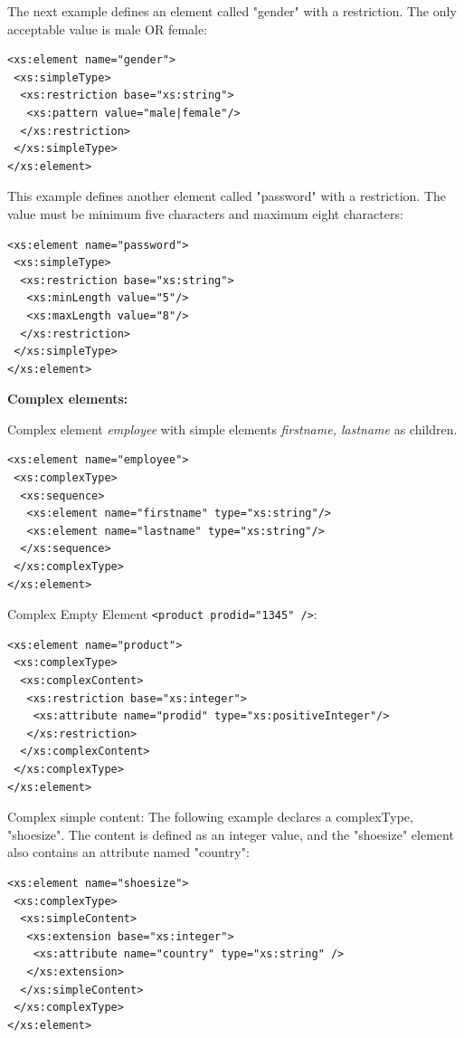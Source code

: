 \documentclass[11pt,oneside,a4paper]{article}
\begin{document}
\newpage

The next example defines an element called "gender" with a restriction. The only acceptable value is male OR female:
\lstset{language=XML}
\begin{lstlisting}
<xs:element name="gender">
 <xs:simpleType>
  <xs:restriction base="xs:string">
   <xs:pattern value="male|female"/>
  </xs:restriction>
 </xs:simpleType>
</xs:element> 
\end{lstlisting}

This example defines another element called "password" with a restriction. The value must be minimum five characters and maximum eight characters:
\lstset{language=XML}
\begin{lstlisting}
<xs:element name="password">
 <xs:simpleType>
  <xs:restriction base="xs:string">
   <xs:minLength value="5"/>
   <xs:maxLength value="8"/>
  </xs:restriction>
 </xs:simpleType>
</xs:element> 
\end{lstlisting}

\textbf{Complex elements:}

Complex element \textit{employee} with simple elements \textit{firstname, lastname} as children.
\lstset{language=XML}
\begin{lstlisting}
<xs:element name="employee">
 <xs:complexType>
  <xs:sequence>
   <xs:element name="firstname" type="xs:string"/>
   <xs:element name="lastname" type="xs:string"/>
  </xs:sequence>
 </xs:complexType>
</xs:element> 
\end{lstlisting}

Complex Empty Element \verb|<product prodid="1345" />|:
\lstset{language=XML}
\begin{lstlisting}
<xs:element name="product">
 <xs:complexType>
  <xs:complexContent>
   <xs:restriction base="xs:integer">
    <xs:attribute name="prodid" type="xs:positiveInteger"/>
   </xs:restriction>
  </xs:complexContent>
 </xs:complexType>
</xs:element> 
\end{lstlisting}

Complex simple content: The following example declares a complexType, "shoesize". The content is defined as an integer value, and the "shoesize" element also contains an attribute named "country":
\lstset{language=XML}
\begin{lstlisting}
<xs:element name="shoesize">
 <xs:complexType>
  <xs:simpleContent>
   <xs:extension base="xs:integer">
    <xs:attribute name="country" type="xs:string" />
   </xs:extension>
  </xs:simpleContent>
 </xs:complexType>
</xs:element> 
\end{lstlisting}
\end{document}
